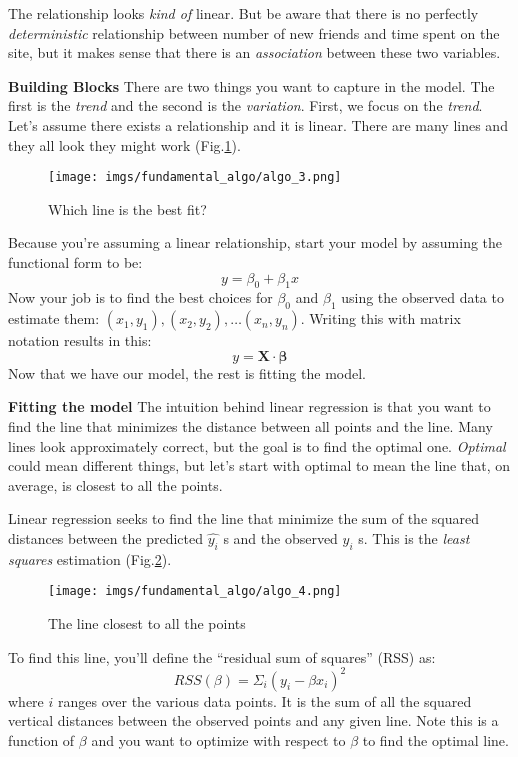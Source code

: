 The relationship looks \textit{kind of} linear. But be aware that there is no perfectly \textit{deterministic} relationship between number of new friends and time spent on the site, but it makes sense that there is an \textit{association} between these two variables.

\textbf{Building Blocks} There are two things you want to capture in the model. The first is the \textit{trend} and the second is the \textit{variation}. First, we focus on the \textit{trend}. Let's assume there exists a relationship and it is linear. There are many lines and they all look they might work (Fig.\ref{fig:algo_3}).

\begin{figure}[H]
    \centering
    \texttt{[image: imgs/fundamental\_algo/algo\_3.png]}
    \caption{Which line is the best fit?}
    \label{fig:algo_3}
\end{figure}

Because you're assuming a linear relationship, start your model by assuming the functional form to be:
$$
    y=\beta_{0}+\beta_{1} x
$$
Now your job is to find the best choices for \(\beta_{0}\) and \(\beta_{1}\) using the observed data to estimate them: \(\left(x_{1}, y_{1}\right),\left(x_{2}, y_{2}\right), \ldots\left(x_{n}, y_{n}\right)\). Writing this with matrix notation results in this:
$$
    y=\mathbf{X} \cdot \boldsymbol{\beta}
$$
Now that we have our model, the rest is fitting the model.

\textbf{Fitting the model} The intuition behind linear regression is that you want to find the line that minimizes the distance between all points and the line. Many lines look approximately correct, but the goal is to find the optimal one. \textit{Optimal} could mean different things, but let's start with optimal to mean the line that, on average, is closest to all the points.

Linear regression seeks to find the line that minimize the sum of the squared distances between the predicted \(\widehat{y_{i}}\) s and the observed \(y_{i}\) s. This is the \textit{least squares} estimation (Fig.\ref{fig:algo_4}).
\begin{figure}[H]
    \centering
    \texttt{[image: imgs/fundamental\_algo/algo\_4.png]}
    \caption{The line closest to all the points}
    \label{fig:algo_4}
\end{figure}
To find this line, you'll define the ``residual sum of squares'' (RSS) as:
\begin{equation}
    R S S(\beta)=\Sigma_{i}\left(y_{i}-\beta x_{i}\right)^{2}
    \label{eq:rss}
\end{equation}
where \(i\) ranges over the various data points. It is the sum of all the squared vertical distances between the observed points and any given line. Note this is a function of \(\beta\) and you want to optimize with respect to \(\beta\) to find the optimal line.

